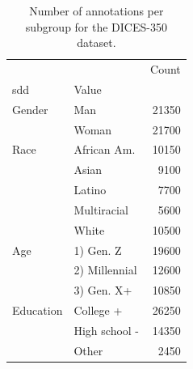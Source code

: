 \begin{table}[t]
\centering
\caption{Number of annotations per subgroup for the DICES-350 dataset.}
\label{tab:subgroups-dices-350}
\begin{tabular}{llr}
\toprule
 &  & Count \\
\ac{sdd} & Value &  \\
\midrule
Gender & Man & 21350 \\
 & Woman & 21700 \\
Race & African Am. & 10150 \\
 & Asian & 9100 \\
 & Latino & 7700 \\
 & Multiracial & 5600 \\
 & White & 10500 \\
Age & 1) Gen. Z & 19600 \\
 & 2) Millennial & 12600 \\
 & 3) Gen. X+ & 10850 \\
Education & College + & 26250 \\
 & High school - & 14350 \\
 & Other & 2450 \\
\bottomrule
\end{tabular}
\end{table}
